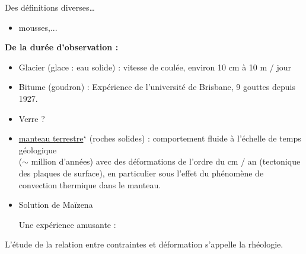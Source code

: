 {\begin{frame}{Des définitions diverses\ldots}
\begin{itemize}[<+-| alert@+>]
\item mousses,...

\end{itemize}

\medskip 

\pause

\textbf{De la durée d'observation :}

\begin{itemize}[<+-| alert@+>]
\item 
	Glacier (glace : eau solide) : 
	vitesse de coulée, %
	environ 10 cm à 10 m / jour

\item
	Bitume (goudron) :
	Expérience de l'université de Brisbane, 9 gouttes depuis 1927.
	
\item Verre ?

\item 

	\hyperlink{frame:manteau_terrestre}{manteau terrestre$^\star$}
	(roches solides) : comportement fluide à l'échelle de temps géologique 
	\\ ($\sim$ million d'années) avec des déformations de l'ordre du cm / an 
	(tectonique des plaques de surface), en particulier 
	sous l'effet du phénomène de convection thermique dans le manteau.

\item Solution de Maïzena 

Une expérience amusante : 
\href{https://www.youtube.com/watch?v=f2XQ97XHjVw}{
\color{blue}{https://www.youtube.com/watch?v=f2XQ97XHjVw}
}


\end{itemize}



\medskip
\pause


L'étude de la relation entre contraintes et déformation s'appelle la rhéologie.

\end{frame}


}




